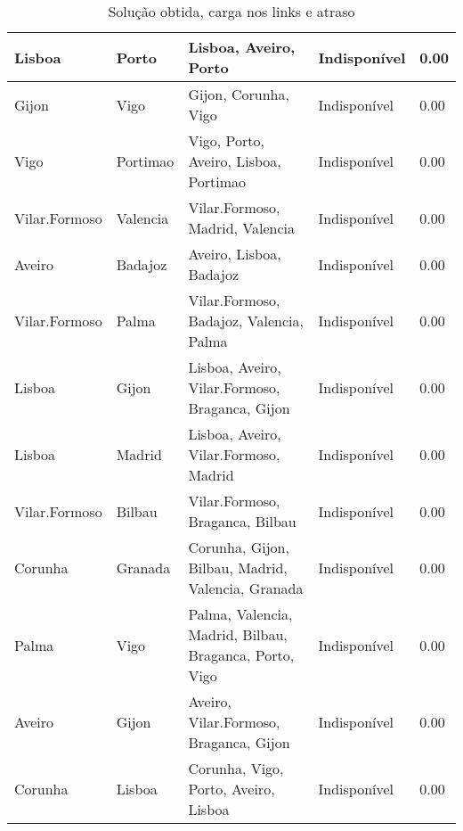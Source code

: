 \begin{table}[!htb]
{\begin{tabular}{|l|l|l|l|l|}
Lisboa & Porto & Lisboa, Aveiro, Porto & Indisponível & 0.00 \\ \hline
Gijon & Vigo & Gijon, Corunha, Vigo & Indisponível & 0.00 \\ \hline
Vigo & Portimao & Vigo, Porto, Aveiro, Lisboa, Portimao & Indisponível & 0.00 \\ \hline
Vilar.Formoso & Valencia & Vilar.Formoso, Madrid, Valencia & Indisponível & 0.00 \\ \hline
Aveiro & Badajoz & Aveiro, Lisboa, Badajoz & Indisponível & 0.00 \\ \hline
Vilar.Formoso & Palma & Vilar.Formoso, Badajoz, Valencia, Palma & Indisponível & 0.00 \\ \hline
Lisboa & Gijon & Lisboa, Aveiro, Vilar.Formoso, Braganca, Gijon & Indisponível & 0.00 \\ \hline
Lisboa & Madrid & Lisboa, Aveiro, Vilar.Formoso, Madrid & Indisponível & 0.00 \\ \hline
Vilar.Formoso & Bilbau & Vilar.Formoso, Braganca, Bilbau & Indisponível & 0.00 \\ \hline
Corunha & Granada & Corunha, Gijon, Bilbau, Madrid, Valencia, Granada & Indisponível & 0.00 \\ \hline
Palma & Vigo & Palma, Valencia, Madrid, Bilbau, Braganca, Porto, Vigo & Indisponível & 0.00 \\ \hline
Aveiro & Gijon & Aveiro, Vilar.Formoso, Braganca, Gijon & Indisponível & 0.00 \\ \hline
Corunha & Lisboa & Corunha, Vigo, Porto, Aveiro, Lisboa & Indisponível & 0.00 \\ \hline
\end{tabular}}
\caption[]{Solução obtida, carga nos links e atraso}
\end{table}

